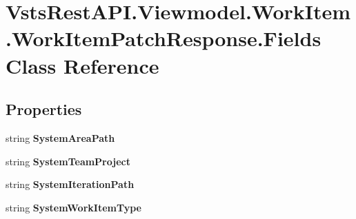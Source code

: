 \hypertarget{class_vsts_rest_a_p_i_1_1_viewmodel_1_1_work_item_1_1_work_item_patch_response_1_1_fields}{}\section{Vsts\+Rest\+A\+P\+I.\+Viewmodel.\+Work\+Item.\+Work\+Item\+Patch\+Response.\+Fields Class Reference}
\label{class_vsts_rest_a_p_i_1_1_viewmodel_1_1_work_item_1_1_work_item_patch_response_1_1_fields}
\subsection*{Properties}
\begin{DoxyCompactItemize}
\item 
\mbox{\label{class_vsts_rest_a_p_i_1_1_viewmodel_1_1_work_item_1_1_work_item_patch_response_1_1_fields_ad4fad9482221d9d5c337a39172d7b7c1}} 
string {\bfseries System\+Area\+Path}
\item 
\mbox{\label{class_vsts_rest_a_p_i_1_1_viewmodel_1_1_work_item_1_1_work_item_patch_response_1_1_fields_a6a5b31e7ffe497441ad8cfba8a3818b0}} 
string {\bfseries System\+Team\+Project}
\item 
\mbox{\label{class_vsts_rest_a_p_i_1_1_viewmodel_1_1_work_item_1_1_work_item_patch_response_1_1_fields_a19660db0d9b8e5255f8b62801f77bf19}} 
string {\bfseries System\+Iteration\+Path}
\item 
\mbox{\label{class_vsts_rest_a_p_i_1_1_viewmodel_1_1_work_item_1_1_work_item_patch_response_1_1_fields_a24fc4358ea7f83361ceda80b7587faea}} 
string {\bfseries System\+Work\+Item\+Type}

\end{DoxyCompactItemize}
